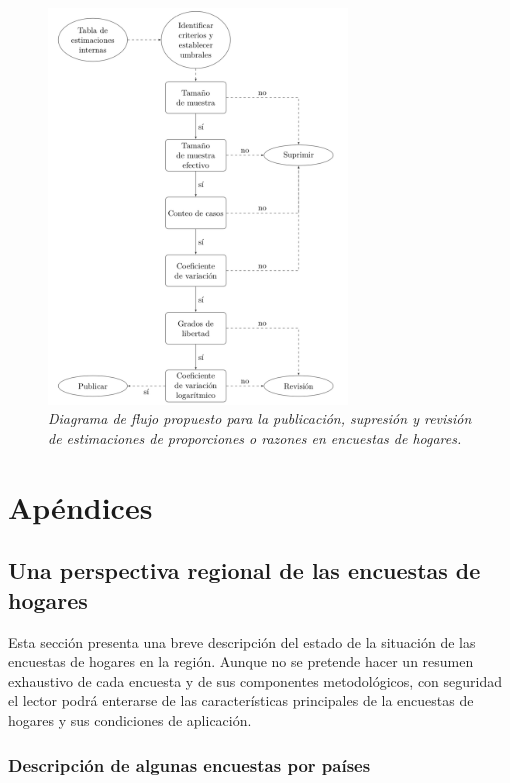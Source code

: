 \documentclass[
  10pt,
  spanish,
]{book}
\begin{document}
\begin{figure}
\centering
\includegraphics[width=3.125in,height=\textheight]{Pics/CSj1.png}
\caption{\emph{Diagrama de flujo propuesto para la publicación, supresión y revisión de estimaciones de proporciones o razones en encuestas de hogares.}}
\end{figure}

\hypertarget{part-apuxe9ndices}{%
\part{Apéndices}\label{part-apuxe9ndices}}

\hypertarget{appendix-appendix}{%
\appendix}


\hypertarget{una-perspectiva-regional-de-las-encuestas-de-hogares}{%
\chapter{Una perspectiva regional de las encuestas de hogares}\label{una-perspectiva-regional-de-las-encuestas-de-hogares}}

Esta sección presenta una breve descripción del estado de la situación de las encuestas de hogares en la región. Aunque no se pretende hacer un resumen exhaustivo de cada encuesta y de sus componentes metodológicos, con seguridad el lector podrá enterarse de las características principales de la encuestas de hogares y sus condiciones de aplicación.

\hypertarget{descripciuxf3n-de-algunas-encuestas-por-pauxedses}{%
\section{Descripción de algunas encuestas por países}\label{descripciuxf3n-de-algunas-encuestas-por-pauxedses}}
\end{document}
